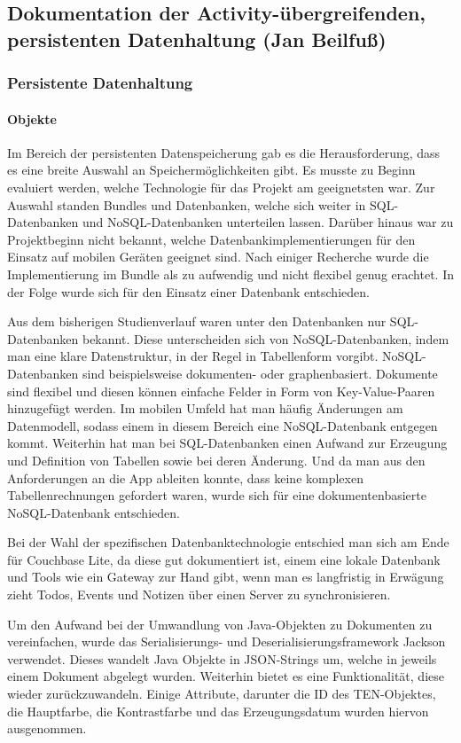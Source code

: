 \subsection{Dokumentation der Activity-übergreifenden, persistenten Datenhaltung (Jan Beilfuß)}
\subsubsection{Persistente Datenhaltung}
\paragraph{Objekte}
Im Bereich der persistenten Datenspeicherung gab es die Herausforderung, dass es eine breite Auswahl an Speichermöglichkeiten gibt. Es musste zu Beginn evaluiert werden, welche Technologie für das Projekt am geeignetsten war. Zur Auswahl standen Bundles und Datenbanken, welche sich weiter in SQL-Datenbanken und NoSQL-Datenbanken unterteilen lassen. Darüber hinaus war zu Projektbeginn nicht bekannt, welche Datenbankimplementierungen für den Einsatz auf mobilen Geräten geeignet sind. Nach einiger Recherche wurde die Implementierung im Bundle als zu aufwendig und nicht flexibel genug erachtet. In der Folge wurde sich für den Einsatz einer Datenbank entschieden.

Aus dem bisherigen Studienverlauf waren unter den Datenbanken nur SQL-Datenbanken bekannt. Diese unterscheiden sich von NoSQL-Datenbanken, indem man eine klare Datenstruktur, in der Regel in Tabellenform vorgibt. NoSQL-Datenbanken sind beispielsweise dokumenten- oder graphenbasiert. Dokumente sind flexibel und diesen können einfache Felder in Form von Key-Value-Paaren hinzugefügt werden. Im mobilen Umfeld hat man häufig Änderungen am Datenmodell, sodass einem in diesem Bereich eine NoSQL-Datenbank entgegen kommt. Weiterhin hat man bei SQL-Datenbanken einen Aufwand zur Erzeugung und Definition von Tabellen sowie bei deren Änderung. Und da man aus den Anforderungen an die App ableiten konnte, dass keine komplexen Tabellenrechnungen gefordert waren, wurde sich für eine dokumentenbasierte NoSQL-Datenbank entschieden.

Bei der Wahl der spezifischen Datenbanktechnologie entschied man sich am Ende für Couchbase Lite, da diese gut dokumentiert ist, einem eine lokale Datenbank und Tools wie ein Gateway zur Hand gibt, wenn man es langfristig in Erwägung zieht Todos, Events und Notizen über einen Server zu synchronisieren.

Um den Aufwand bei der Umwandlung von Java-Objekten zu Dokumenten zu vereinfachen, wurde das Serialisierungs- und Deserialisierungsframework Jackson verwendet. Dieses wandelt Java Objekte in JSON-Strings um, welche in jeweils einem Dokument abgelegt wurden. Weiterhin bietet es eine Funktionalität, diese wieder zurückzuwandeln. Einige Attribute, darunter die ID des TEN-Objektes, die Hauptfarbe, die Kontrastfarbe und das Erzeugungsdatum wurden hiervon ausgenommen.

